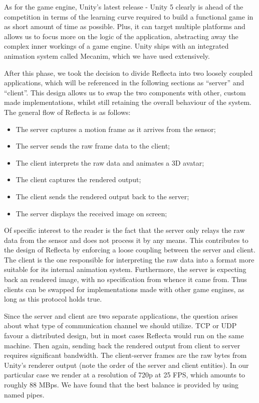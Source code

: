 \documentclass[a4paper, 12pt]{amsart}
\begin{document}
As for the game engine, Unity's latest release - Unity 5 clearly is ahead of the competition in terms of the learning curve required to build a functional game in as short amount of time as possible. Plus, it can target multiple platforms and allows us to focus more on the logic of the application, abstracting away the complex inner workings of a game engine. Unity ships with an integrated animation system called Mecanim, which we have used extensively.

After this phase, we took the decision to divide Reflecta into two loosely coupled applications, which will be referenced in the following sections as ``server'' and ``client''. This design allows us to swap the two components with other, custom made implementations, whilst still retaining the overall behaviour of the system. The general flow of Reflecta is as follows:

\begin{itemize}
\item The server captures a motion frame as it arrives from the sensor;
\item The server sends the raw frame data to the client;
\item The client interprets the raw data and animates a 3D avatar;
\item The client captures the rendered output;
\item The client sends the rendered output back to the server;
\item The server displays the received image on screen;
\end{itemize}

Of specific interest to the reader is the fact that the server only relays the raw data from the sensor and does not process it by any means. This contributes to the design of Reflecta by enforcing a loose coupling between the server and client. The client is the one responsible for interpreting the raw data into a format more suitable for its internal animation system. Furthermore, the server is expecting back an rendered image, with no specification from whence it came from. Thus clients can be swapped for implementations made with other game engines, as long as this protocol holds true.

Since the server and client are two separate applications, the question arises about what type of communication channel we should utilize. TCP or UDP favour a distributed design, but in most cases Reflecta would run on the same machine. Then again, sending back the rendered output from client to server requires significant bandwidth. The client-server frames are the raw bytes from Unity's renderer output (note the order of the server and client entities). In our particular case we render at a resolution of 720p at 25 FPS, which amounts to roughly 88 MBps. We have found that the best balance is provided by using named pipes.
\end{document}
